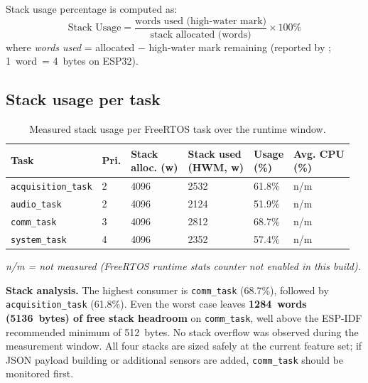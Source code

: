 \documentclass[11pt,a4paper]{article}
\newcommand{\rowhdr}{\rowcolor{tablehdr}}
\begin{document}
Stack usage percentage is computed as:
\[
\text{Stack Usage} = \frac{\text{words used (high-water mark)}}{\text{stack allocated (words)}} \times 100\%
\]
where \emph{words used} = allocated $-$ high-water mark remaining (reported by
\texttt{}; 1~word~= 4~bytes on ESP32).

\subsection{Stack usage per task}

\vspace{5pt}
{\footnotesize
\setlength{\tabcolsep}{4pt}
\renewcommand{\arraystretch}{1.1}

\setlength\LTleft{0pt}
\begin{longtable}{@{}p{3.0cm}p{1.5cm}p{2.5cm}p{2.5cm}p{2.5cm}p{2.5cm}@{}}
\caption{Measured stack usage per FreeRTOS task over the runtime window.\label{tab:stack_usage}}\\
\rowhdr
\textbf{Task} & \textbf{Pri.} &
\makecell[c]{\textbf{Stack}\\\textbf{alloc. (w)}} &
\makecell[c]{\textbf{Stack used}\\\textbf{(HWM, w)}} &
\makecell[c]{\textbf{Usage}\\\textbf{(\%)}} &
\makecell[c]{\textbf{Avg. CPU}\\\textbf{(\%)}} \\
\midrule
\endhead
\texttt{acquisition\_task} & 2 & 4096 & 2532 & 61.8\% & n/m \\
\texttt{audio\_task}       & 2 & 4096 & 2124 & 51.9\% & n/m \\
\texttt{comm\_task}        & 3 & 4096 & 2812 & 68.7\% & n/m \\
\texttt{system\_task}      & 4 & 4096 & 2352 & 57.4\% & n/m \\
\bottomrule
\end{longtable}
}
{\small\textit{n/m = not measured (FreeRTOS runtime stats counter not enabled in this build).}}

\medskip
\begin{mdframed}[style=infoboxstyle]
\textbf{Stack analysis.}
The highest consumer is \texttt{comm\_task} (68.7\%), followed by \texttt{acquisition\_task}
(61.8\%). Even the worst case leaves \textbf{1284~words (5136~bytes) of free stack headroom}
on \texttt{comm\_task}, well above the ESP-IDF recommended minimum of 512~bytes. No stack
overflow was observed during the measurement window. All four stacks are sized safely at the
current feature set; if JSON payload building or additional sensors are added,
\texttt{comm\_task} should be monitored first.
\end{mdframed}
\end{document}
